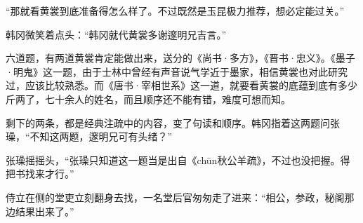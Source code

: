 “那就看黄裳到底准备得怎么样了。不过既然是玉昆极力推荐，想必定能过关。”

韩冈微笑着点头：“韩冈就代黄裳多谢邃明兄吉言。”

六道题，有两道黄裳肯定能做出来，送分的《尚书·多方》，《晋书·忠义》。《墨子·明鬼》这一题，由于士林中曾经有声音说气学近于墨家，相信黄裳也对此研究过，应该比较熟悉。而《唐书·宰相世系》这一道，就要看黄裳的底蕴到底有多少斤两了，七十余人的姓名，而且顺序还不能有错，难度可想而知。

剩下的两条，都是经典注疏中的内容，变了句读和顺序。韩冈指着这两题问张璪，“不知这两题，邃明兄可有头绪？”

张璪摇摇头，“张璪只知道这一题当是出自《chūn秋公羊疏》，不过也没把握。得把书找来才行。”

侍立在侧的堂吏立刻翻身去找，一名堂后官匆匆走了进来：“相公，参政，秘阁那边结果出来了。”

